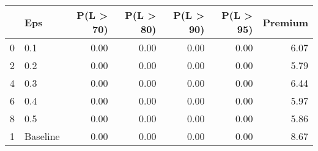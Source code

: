 \begin{tabular}{llrrrrr}
\toprule
{} &       Eps &  P(L > 70) &  P(L > 80) &  P(L > 90) &  P(L > 95) &  Premium \\
\midrule
0 &       0.1 &       0.00 &       0.00 &       0.00 &       0.00 &     6.07 \\
2 &       0.2 &       0.00 &       0.00 &       0.00 &       0.00 &     5.79 \\
4 &       0.3 &       0.00 &       0.00 &       0.00 &       0.00 &     6.44 \\
6 &       0.4 &       0.00 &       0.00 &       0.00 &       0.00 &     5.97 \\
8 &       0.5 &       0.00 &       0.00 &       0.00 &       0.00 &     5.86 \\
1 &  Baseline &       0.00 &       0.00 &       0.00 &       0.00 &     8.67 \\
\bottomrule
\end{tabular}
